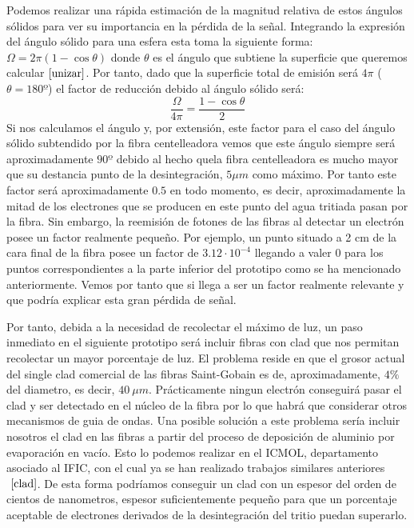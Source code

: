 Podemos realizar una rápida estimación de la magnitud relativa de estos ángulos sólidos para ver su importancia en la pérdida de la señal. Integrando la expresión del ángulo sólido para una esfera esta toma la siguiente forma: $\Omega=2\pi(1-\cos{\theta})$ donde $\theta$ es el ángulo que subtiene la superficie que queremos calcular$~\cite{unizar}$. Por tanto, dado que la superficie total de emisión será $4\pi$ ($\theta=180º$) el factor de reducción debido al ángulo sólido será:
\begin{equation}
\frac{\Omega}{4\pi}=\frac{1-\cos{\theta}}{2}
\label{factordebidoalangulosolido}
\end{equation}
Si nos calculamos el ángulo y, por extensión, este factor para el caso del ángulo sólido subtendido por la fibra centelleadora vemos que este ángulo siempre será aproximadamente $90º$ debido al hecho quela fibra centelleadora es mucho mayor que su destancia punto de la desintegración, $5\mu m$ como máximo. Por tanto este factor será aproximadamente $0.5$ en todo momento, es decir, aproximadamente la mitad de los electrones que se producen en este punto del agua tritiada pasan por la fibra. Sin embargo, la reemisión de fotones de las fibras al detectar un electrón posee un factor realmente pequeño. Por ejemplo, un punto situado a 2 cm de la cara final de la fibra posee un factor de $3.12\cdotp 10^{-4}$ llegando a valer $0$ para los puntos correspondientes a la parte inferior del prototipo como se ha mencionado anteriormente. Vemos por tanto que si llega a ser un factor realmente relevante y que podría explicar esta gran pérdida de señal. 

Por tanto, debida a la necesidad de recolectar el máximo de luz, un paso inmediato en el siguiente prototipo será incluir fibras con clad que nos permitan recolectar un mayor porcentaje de luz. El problema reside en que el grosor actual del single clad comercial de las fibras Saint-Gobain es de, aproximadamente, $4\%$ del diametro, es decir, $40~\mu m$. Prácticamente ningun electrón conseguirá pasar el clad y ser detectado en el núcleo de la fibra por lo que habrá que considerar otros mecanismos de guia de ondas. Una posible solución a este problema sería incluir nosotros el clad en las fibras a partir del proceso de deposición de aluminio por evaporación en vacío. Esto lo podemos realizar en el ICMOL, departamento asociado al IFIC, con el cual ya se han realizado trabajos similares anteriores$~\cite{clad}$. De esta forma podríamos conseguir un clad con un espesor del orden de cientos de nanometros, espesor suficientemente pequeño para que un porcentaje aceptable de electrones derivados de la desintegración del tritio puedan superarlo. 

